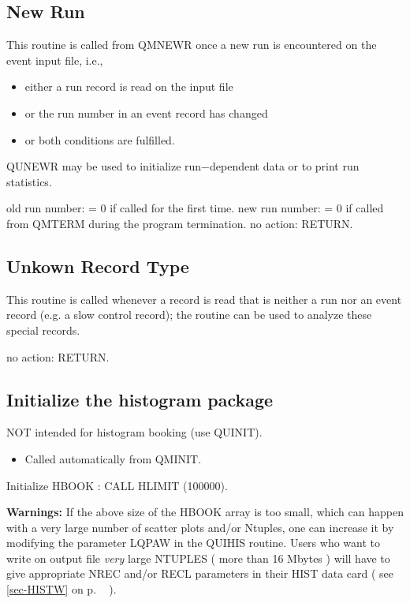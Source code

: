 \subsection{\label{sec-QUN}New Run}
\par
{}
\par This routine is
called from QMNEWR once a new run is encountered on the event input
file, i.e.,
\begin{itemize}
\item either a run record is read on the input file
\item or the run number in an event record has changed
\item or both conditions are fulfilled.
\end{itemize}
QUNEWR
may be used to initialize run$-$dependent data or to print run statistics.
\begin{indentlist}{ 2.50cm}{ 2.75cm}
old run number:
= 0 if called for the first time.
new run number:
= 0 if called from QMTERM during the program termination.
no action: RETURN.
 
\end{indentlist}
\par
\subsection{\label{sec-QUSREC}Unkown Record Type}
\par
{}
\par This routine is
called whenever a record is read that is neither a run
nor an event record (e.g. a slow control record); the routine can be used
to analyze these special records.
\begin{indentlist}{ 3.00cm}{ 3.25cm}
no action: RETURN.
\end{indentlist}
\subsection{\label{sec-QUIH}Initialize the histogram package}
\par
{}
\par NOT intended for histogram
booking (use QUINIT).
\begin{itemize}
\item Called automatically from QMINIT.
\end{itemize}
\begin{indentlist}{ 3.00cm}{ 3.25cm}
 
Initialize HBOOK : CALL HLIMIT (100000).
\end{indentlist}
{\bf Warnings:} If the above size of the HBOOK array is too small, which can happen with
a very large number of scatter plots and/or Ntuples, one can increase it
by modifying the parameter LQPAW in the QUIHIS routine.
Users who want to write on output file  {\em very}
large NTUPLES ( more than 16 Mbytes ) will have to give appropriate NREC and/or  RECL parameters
in their HIST data card ( see \ref{sec-HISTW} on p. ~\pageref{sec-HISTW} ).
 
